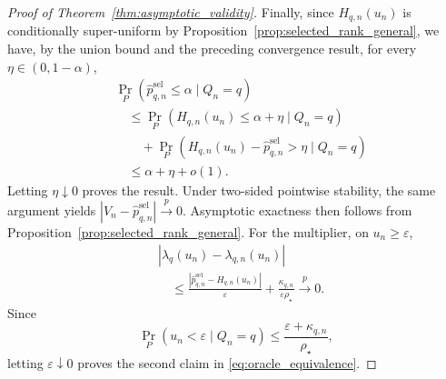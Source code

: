 \documentclass[10pt]{article}
\begin{document}
\begin{proof}[Proof of Theorem~\ref{thm:asymptotic_validity}]
Finally, since $H_{q,n}(u_n)$ is conditionally super-uniform by
Proposition~\ref{prop:selected_rank_general}, we have, by the union bound and the preceding convergence result, for every $\eta \in(0,1-\alpha)$,
\[
\begin{aligned}
&\Pr_P(\widehat p_{q,n}^{\mathrm{sel}}\le\alpha\mid Q_n=q)\\
&\quad\le
\Pr_P(H_{q,n}(u_n)\le\alpha+\eta\mid Q_n=q)\\
&\qquad+
\Pr_P(H_{q,n}(u_n)-\widehat p_{q,n}^{\mathrm{sel}}>\eta\mid Q_n=q)\\
&\quad\le\alpha+\eta+o(1).
\end{aligned}
\]
Letting $\eta\downarrow0$ proves the result. Under two-sided
pointwise stability, the same argument yields
$|V_n-\widehat p_{q,n}^{\mathrm{sel}}|
\stackrel{p}{\longrightarrow}0$.
Asymptotic exactness then follows from
Proposition~\ref{prop:selected_rank_general}.
For the multiplier, on $u_n\ge\varepsilon$,
\[
\begin{aligned}
&\left|\widehat\lambda_q(u_n)
-\lambda_{q,n}(u_n)\right|\\
&\quad\le
\frac{\left|\widehat p_{q,n}^{\mathrm{sel}}
-H_{q,n}(u_n)\right|}{\varepsilon}
+\frac{\kappa_{q,n}}{\varepsilon\rho_\star}
\stackrel{p}{\longrightarrow}0.
\end{aligned}
\]
Since
\[
\Pr_P(u_n<\varepsilon\mid Q_n=q)
\le\frac{\varepsilon+\kappa_{q,n}}{\rho_\star},
\]
letting $\varepsilon\downarrow0$ proves the
second claim in \eqref{eq:oracle_equivalence}.

\end{proof}
\end{document}
